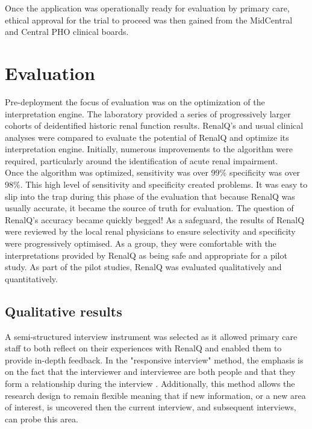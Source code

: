 ﻿\documentclass[11pt]{article}
\begin{document}
Once the application was operationally ready for evaluation by primary care, ethical approval for the trial to proceed was then gained from the MidCentral and Central PHO clinical boards. \\

\section{Evaluation}
Pre-deployment the focus of evaluation was on the optimization of the interpretation engine. The laboratory provided a series of progressively larger cohorts of deidentified historic renal function results. RenalQ's and usual clinical analyses were compared to evaluate the potential of RenalQ and optimize its interpretation engine.  Initially, numerous improvements to the algorithm were required, particularly around the identification of acute renal impairment. \\

Once the algorithm was optimized, sensitivity was over 99\% specificity was over 98\%. This high level of sensitivity and specificity created problems. It was easy to slip into the trap during this phase of the evaluation that because RenalQ was usually accurate, it became the source of truth for evaluation. The question of RenalQ's accuracy became quickly begged! As a safeguard, the results of RenalQ were reviewed by the local renal physicians to ensure selectivity and specificity were progressively optimised. As a group, they were comfortable with the interpretations provided by RenalQ as being safe and appropriate for a pilot study. As part of the pilot studies, RenalQ was evaluated qualitatively and quantitatively. \\

\subsection{Qualitative results}
A semi-structured interview instrument was selected as it allowed primary care staff to both reflect on their experiences with RenalQ and enabled them to provide in-depth feedback. In the "responsive interview" method, the emphasis is on the fact that the interviewer and interviewee are both people and that they form a relationship during the interview \citep{rubin2011qualitative}. Additionally, this method allows the research design to remain flexible meaning that if new information, or a new area of interest, is uncovered then the current interview, and subsequent interviews, can probe this area. \\
\end{document}
